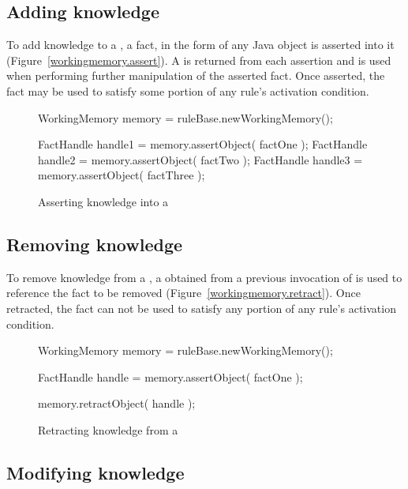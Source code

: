 \subsection{Adding knowledge}

To add knowledge to a , a fact, in the form of
any Java object is asserted into it
(Figure~\vref{workingmemory.assert}).  A  is
returned from each assertion and is used when performing further
manipulation of the asserted fact.  Once asserted, the fact may be
used to satisfy some portion of any rule's activation condition.

\begin{figure}
\begin{javaCodelisting}
WorkingMemory memory = ruleBase.newWorkingMemory();

FactHandle handle1 = memory.assertObject( factOne );
FactHandle handle2 = memory.assertObject( factTwo );
FactHandle handle3 = memory.assertObject( factThree );
\end{javaCodelisting}
\caption{Asserting knowledge into a }
\label{workingmemory.assert}
\end{figure}

\subsection{Removing knowledge}

To remove knowledge from a , a
 obtained from a previous invocation of
 is used to reference
the fact to be removed (Figure~\vref{workingmemory.retract}).
Once retracted, the fact can not be used to satisfy any portion
of any rule's activation condition.

\begin{figure}
\begin{javaCodelisting}
WorkingMemory memory = ruleBase.newWorkingMemory();

FactHandle handle = memory.assertObject( factOne );

memory.retractObject( handle );
\end{javaCodelisting}
\caption{Retracting knowledge from a }
\label{workingmemory.retract}
\end{figure}

\subsection{Modifying knowledge}

